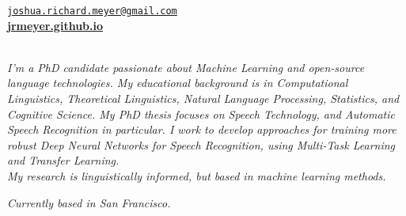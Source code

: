 \documentclass{resume} %
\begin{document}
\vspace{-.25cm}
\begin{center}
  \href{mailto:joshua.richard.meyer@gmail.com}{\nolinkurl{joshua.richard.meyer@gmail.com}}\\
  \vspace{.15cm}
  \href{https://jrmeyer.github.io}{\textbf{jrmeyer.github.io}} \\
  \vspace{.15cm}
  \href{https://github.com/JRMeyer}{\faGithub} \hspace{.25cm} \href{https://www.linkedin.com/in/josh-r-meyer/}{\faLinkedin} \\

\vspace{.5cm}

\textit{I'm a PhD candidate passionate about Machine Learning and open-source language technologies. My educational background is in Computational Linguistics, Theoretical Linguistics, Natural Language Processing, Statistics, and Cognitive Science. My PhD thesis focuses on Speech Technology, and Automatic Speech Recognition in particular. I work to develop approaches for training more robust Deep Neural Networks for Speech Recognition, using Multi-Task Learning and Transfer Learning. \\ My research is linguistically informed, but based in machine learning methods. }

\vspace{.5cm}

\textit{Currently based in San Francisco.}
\end{center}
\end{document}
